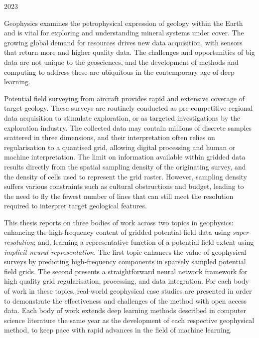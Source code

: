 \documentclass[12pt,a4paper,notitlepage]{report} %
\begin{document}
\begin{titlepage}
    \vspace*{\fill}
    2023
\end{titlepage}

\shipout\null

\setcounter{page}{1}

Geophysics examines the petrophysical expression of geology within the Earth and is vital for exploring and understanding mineral systems under cover.
The growing global demand for resources drives new data acquisition, with sensors that return more and higher quality data.
The challenges and opportunities of big data are not unique to the geosciences, and the development of methods and computing to address these are ubiquitous in the contemporary age of deep learning.

Potential field surveying from aircraft provides rapid and extensive coverage of target geology.
These surveys are routinely conducted as pre-competitive regional data acquisition to stimulate exploration, or as targeted investigations by the exploration industry.
The collected data may contain millions of discrete samples scattered in three dimensions, and their interpretation often relies on regularisation to a quantised grid, allowing digital processing and human or machine interpretation.
The limit on information available within gridded data results directly from the spatial sampling density of the originating survey, and the density of cells used to represent the grid raster.
However, sampling density suffers various constraints such as cultural obstructions and budget, leading to the need to fly the fewest number of lines that can still meet the resolution required to interpret target geological features.

This thesis reports on three bodies of work across two topics in geophysics: enhancing the high-frequency content of gridded potential field data using \emph{super-resolution}; and, learning a representative function of a potential field extent using \emph{implicit neural representation}.
The first topic enhances the value of geophysical surveys by predicting high-frequency components in sparsely sampled potential field grids.
The second presents a straightforward neural network framework for high quality grid regularisation, processing, and data integration.
For each body of work in these topics, real-world geophysical case studies are presented in order to demonstrate the effectiveness and challenges of the method with open access data.
Each body of work extends deep learning methods described in computer science literature the same year as the development of each respective geophysical method, to keep pace with rapid advances in the field of machine learning.
\end{document}
